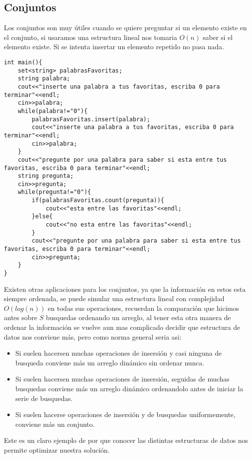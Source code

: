 \subsection{Conjuntos}
Los conjuntos son muy útiles cuando se quiere preguntar si un elemento existe en el conjunto, si usaramos una estructura lineal nos tomaria $O(n)$ saber si el elemento existe. Si se intenta insertar un elemento repetido no pasa nada.
\\\begin{minipage}{\textwidth}
\begin{lstlisting}[style=C,caption=conjunto.cpp]
int main(){
    set<string> palabrasFavoritas;
    string palabra;
    cout<<"inserte una palabra a tus favoritas, escriba 0 para terminar"<<endl;
    cin>>palabra;
    while(palabra!="0"){
        palabrasFavoritas.insert(palabra);
        cout<<"inserte una palabra a tus favoritas, escriba 0 para terminar"<<endl;
        cin>>palabra;
    }
    cout<<"pregunte por una palabra para saber si esta entre tus favoritas, escriba 0 para terminar"<<endl;
    string pregunta;
    cin>>pregunta;
    while(pregunta!="0"){
        if(palabrasFavoritas.count(pregunta)){
            cout<<"esta entre las favoritas"<<endl;
        }else{
            cout<<"no esta entre las favoritas"<<endl;
        }
        cout<<"pregunte por una palabra para saber si esta entre tus favoritas, escriba 0 para terminar"<<endl;
        cin>>pregunta;
    }
}
\end{lstlisting}
\end{minipage}
Existen otras aplicaciones para los conjuntos, ya que la información en estos esta siempre ordenada, se puede simular una estructura lineal con complejidad $O(log(n))$ en todas sus operaciones, recuerdan la comparación que hicimos antes sobre $S$ busquedas ordenando un arreglo, al tener esta otra manera de ordenar la información se vuelve aun mas complicado decidir que estructura de datos nos conviene más, pero como norma general seria asi:
\\\begin{itemize}
\item Si suelen hacersen muchas operaciones de insersión y casi ninguna de busqueda conviene más un arreglo dinámico sin ordenar nunca.
\item Si suelen hacersen muchas operaciones de insersión, seguidas de muchas busquedas conviene más un arreglo dinámico ordenandolo antes de iniciar la serie de busquedas.
\item Si suelen hacerse operaciones de insersión y de busquedas uniformemente, conviene más un conjunto.
\end{itemize}
Este es un claro ejemplo de por que conocer las distintas estructuras de datos nos permite optimizar nuestra solución.
